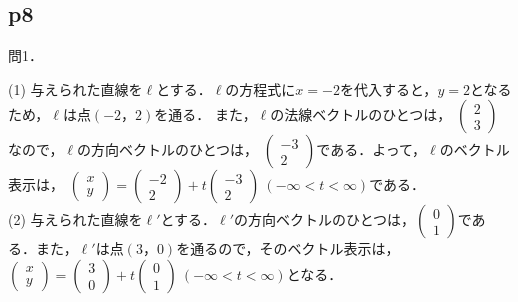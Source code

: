 \documentclass[dvipdfmx,uplatex,11pt]{jsarticle}
\begin{document}
\newpage

\subsection{p8}

問1．

\begin{leftbar}
	(1) \quad 与えられた直線を$\ell$とする．$\ell$の方程式に$x=-2$を代入すると，$y=2$となるため，$\ell$は点$(-2，2)$を通る．
	また，$\ell$の法線ベクトルのひとつは，
	$
	\left(
		\begin{array}{c}
			2 \\
			3
		\end{array}
	\right)
		$なので，$\ell$の方向ベクトルのひとつは，
		$
		\left(
		\begin{array}{c}
			-3 \\
			2
		\end{array}
		\right)
		$である．よって，$\ell$のベクトル表示は，
		$
		\left(
		\begin{array}{c}
			x \\
			y
		\end{array}
		\right)
		= \left(
		\begin{array}{c}
		-2 \\
		2
		\end{array}
		\right)
		+t \left(
			\begin{array}{c}
				-3 \\
				2
			\end{array}
			\right)
			~(-\infty < t < \infty)$である．\\

			(2) \quad 与えられた直線を$\ell'$とする．$\ell '$の方向ベクトルのひとつは，$
			\left (
				\begin{array}{c}
					0 \\
					1
				\end{array}
			\right)
			$である．また，$\ell '$は点$(3，0)$を通るので，そのベクトル表示は，
			$
			\left(
				\begin{array}{c}
					x \\
					y
				\end{array}
			\right)
			= \left(
				\begin{array}{c}
				3 \\
				0
				\end{array}
			\right)
			+t \left(
				\begin{array}{c}
					0 \\
					1
					\end{array}
				\right) ~(-\infty < t < \infty)
				$となる．
		\end{leftbar}
\end{document}
